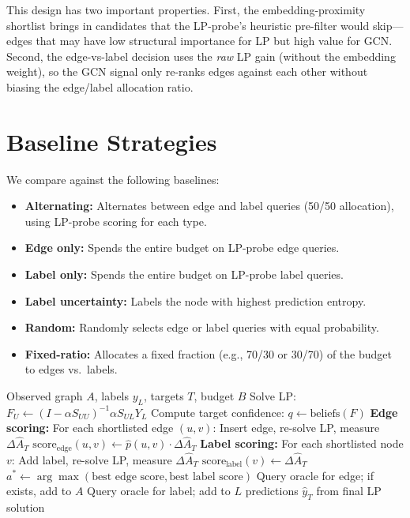 \documentclass[12pt,a4paper,oneside]{report}
\begin{document}
This design has two important properties. First, the embedding-proximity shortlist brings in candidates that the LP-probe's heuristic pre-filter would skip---edges that may have low structural importance for LP but high value for GCN. Second, the edge-vs-label decision uses the \emph{raw} LP gain (without the embedding weight), so the GCN signal only re-ranks edges against each other without biasing the edge/label allocation ratio.

\section{Baseline Strategies}

We compare against the following baselines:
\begin{itemize}[leftmargin=2em]
    \item \textbf{Alternating:} Alternates between edge and label queries (50/50 allocation), using LP-probe scoring for each type.
    \item \textbf{Edge only:} Spends the entire budget on LP-probe edge queries.
    \item \textbf{Label only:} Spends the entire budget on LP-probe label queries.
    \item \textbf{Label uncertainty:} Labels the node with highest prediction entropy.
    \item \textbf{Random:} Randomly selects edge or label queries with equal probability.
    \item \textbf{Fixed-ratio:} Allocates a fixed fraction (e.g., 70/30 or 30/70) of the budget to edges vs.\ labels.
\end{itemize}

\begin{algorithm}[htbp]
\caption{Joint Active Acquisition with LP-Probe Scoring}
\label{alg:joint}
\begin{algorithmic}[1]
\Require Observed graph $A$, labels $y_L$, targets $T$, budget $B$
    \State Solve LP: $F_U \gets (I - \alpha S_{UU})^{-1} \alpha S_{UL} Y_L$
    \State Compute target confidence: $q \gets \text{beliefs}(F)$
    \State \textbf{Edge scoring:} For each shortlisted edge $(u,v)$:
    \State \quad Insert edge, re-solve LP, measure $\Delta \hat{A}_T$
    \State \quad $\text{score}_{\text{edge}}(u,v) \gets \hat{p}(u,v) \cdot \Delta \hat{A}_T$
    \State \textbf{Label scoring:} For each shortlisted node $v$:
    \State \quad Add label, re-solve LP, measure $\Delta \hat{A}_T$
    \State \quad $\text{score}_{\text{label}}(v) \gets \Delta \hat{A}_T$
    \State $a^* \gets \arg\max(\text{best edge score}, \text{best label score})$
        \State Query oracle for edge; if exists, add to $A$
    \Else
        \State Query oracle for label; add to $L$
    \EndIf
\EndFor
\State \Return predictions $\hat{y}_T$ from final LP solution
\end{algorithmic}
\end{algorithm}
\end{document}
